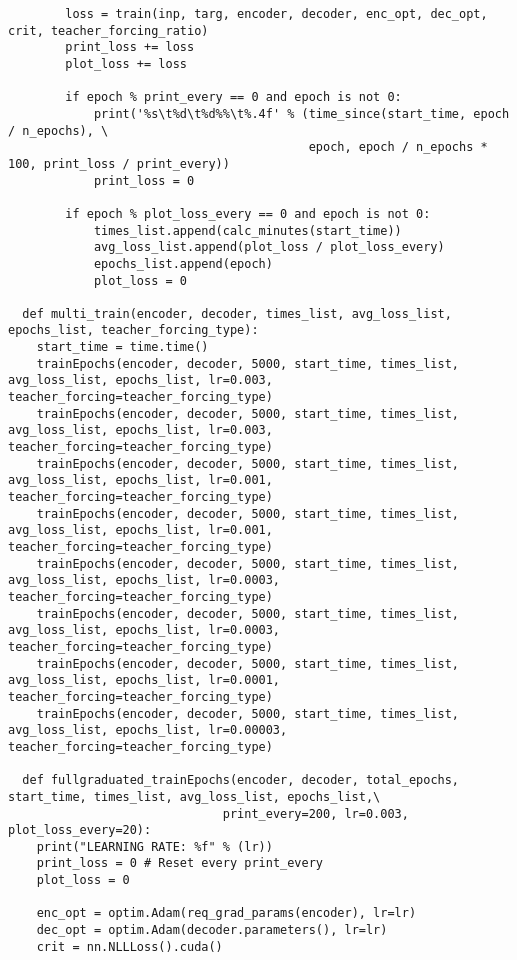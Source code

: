 \begin{lstlisting}
        loss = train(inp, targ, encoder, decoder, enc_opt, dec_opt, crit, teacher_forcing_ratio)
        print_loss += loss
        plot_loss += loss

        if epoch % print_every == 0 and epoch is not 0:
            print('%s\t%d\t%d%%\t%.4f' % (time_since(start_time, epoch / n_epochs), \
                                          epoch, epoch / n_epochs * 100, print_loss / print_every))
            print_loss = 0
        
        if epoch % plot_loss_every == 0 and epoch is not 0:
            times_list.append(calc_minutes(start_time))
            avg_loss_list.append(plot_loss / plot_loss_every)
            epochs_list.append(epoch)
            plot_loss = 0

  def multi_train(encoder, decoder, times_list, avg_loss_list, epochs_list, teacher_forcing_type):
    start_time = time.time()
    trainEpochs(encoder, decoder, 5000, start_time, times_list, avg_loss_list, epochs_list, lr=0.003, teacher_forcing=teacher_forcing_type)
    trainEpochs(encoder, decoder, 5000, start_time, times_list, avg_loss_list, epochs_list, lr=0.003, teacher_forcing=teacher_forcing_type)
    trainEpochs(encoder, decoder, 5000, start_time, times_list, avg_loss_list, epochs_list, lr=0.001, teacher_forcing=teacher_forcing_type)
    trainEpochs(encoder, decoder, 5000, start_time, times_list, avg_loss_list, epochs_list, lr=0.001, teacher_forcing=teacher_forcing_type)
    trainEpochs(encoder, decoder, 5000, start_time, times_list, avg_loss_list, epochs_list, lr=0.0003, teacher_forcing=teacher_forcing_type)
    trainEpochs(encoder, decoder, 5000, start_time, times_list, avg_loss_list, epochs_list, lr=0.0003, teacher_forcing=teacher_forcing_type)
    trainEpochs(encoder, decoder, 5000, start_time, times_list, avg_loss_list, epochs_list, lr=0.0001, teacher_forcing=teacher_forcing_type)
    trainEpochs(encoder, decoder, 5000, start_time, times_list, avg_loss_list, epochs_list, lr=0.00003, teacher_forcing=teacher_forcing_type)

  def fullgraduated_trainEpochs(encoder, decoder, total_epochs, start_time, times_list, avg_loss_list, epochs_list,\
                              print_every=200, lr=0.003, plot_loss_every=20):
    print("LEARNING RATE: %f" % (lr))
    print_loss = 0 # Reset every print_every
    plot_loss = 0
    
    enc_opt = optim.Adam(req_grad_params(encoder), lr=lr)
    dec_opt = optim.Adam(decoder.parameters(), lr=lr)
    crit = nn.NLLLoss().cuda()
    

\end{lstlisting}
